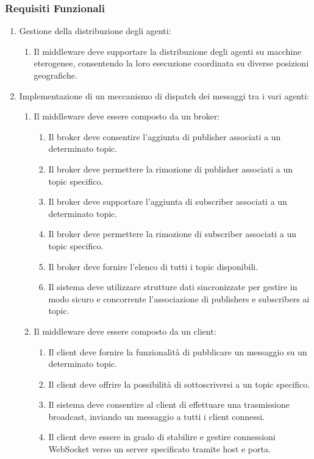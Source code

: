 \subsubsection{Requisiti Funzionali}
\begin{enumerate}
      \item Gestione della distribuzione degli agenti:
            \begin{enumerate}
                  \item  Il middleware deve supportare la distribuzione degli agenti su macchine eterogenee,
                        consentendo la loro esecuzione coordinata su diverse posizioni geografiche.
            \end{enumerate}

      \item Implementazione di un meccanismo di dispatch dei messaggi tra i vari agenti:
            \begin{enumerate}
                  \item Il middleware deve essere composto da un broker:
                        \begin{enumerate}
                              \item Il broker deve consentire l'aggiunta di publisher associati a un determinato topic.
                              \item Il broker deve permettere la rimozione di publisher associati a un topic specifico.
                              \item Il broker deve supportare l'aggiunta di subscriber associati a un determinato topic.
                              \item Il broker deve permettere la rimozione di subscriber associati a un topic specifico.
                              \item Il broker deve fornire l'elenco di tutti i topic disponibili.
                              \item Il sistema deve utilizzare strutture dati sincronizzate per gestire in modo sicuro e concorrente l'associazione di publishers e subscribers ai topic.
                        \end{enumerate}
                  \item Il middleware deve essere composto da un client:
                        \begin{enumerate}
                              \item Il client deve fornire la funzionalità di pubblicare un messaggio su un determinato topic.
                              \item Il client deve offrire la possibilità di sottoscriversi a un topic specifico.
                              \item Il sistema deve consentire al client di effettuare una trasmissione broadcast, inviando un messaggio a tutti i client connessi.
                              \item  Il client deve essere in grado di stabilire e gestire connessioni WebSocket verso un server specificato tramite host e porta.
                        \end{enumerate}
            \end{enumerate}


\end{enumerate}
